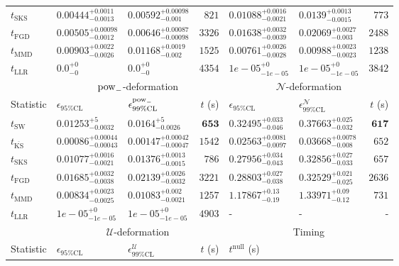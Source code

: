 \begin{tabular}{l|llr|llr}
	$t_{\mathrm{SKS}}$ & $0.00444_{-0.0013}^{+0.0011}$ & $0.00592_{-0.001}^{+0.00098}$ & $821$ & $0.01088_{-0.0021}^{+0.0016}$ & $0.0139_{-0.0015}^{+0.0013}$ & $773$ \\
	$t_{\mathrm{FGD}}$ & $0.00505_{-0.0012}^{+0.00098}$ & $0.00646_{-0.00098}^{+0.00087}$ & $3326$ & $0.01638_{-0.0039}^{+0.0032}$ & $0.02069_{-0.003}^{+0.0027}$ & $2488$ \\
	$t_{\mathrm{MMD}}$ & $0.00903_{-0.0026}^{+0.0022}$ & $0.01168_{-0.002}^{+0.0019}$ & $1525$ & $0.00761_{-0.0028}^{+0.0026}$ & $0.00988_{-0.0023}^{+0.0023}$ & $1238$ \\
	$t_{\mathrm{LLR}}$ & $0.0_{-0}^{+0}$ & $0.0_{-0}^{+0}$ & $4354$ & $1e-05_{-1e-05}^{+0}$ & $1e-05_{-1e-05}^{+0}$ & $3842$ \\
	\toprule
	\multicolumn{1}{c}{} & \multicolumn{3}{c}{$\rm{pow}_{-}$-deformation} & \multicolumn{3}{c}{$\mathcal{N}$-deformation} \\
	Statistic & $\epsilon_{95\%\mathrm{CL}}$ & $\epsilon^  {\rm{pow}_{-}}_{99\%\mathrm{CL}}$ & $t$ (s) & $\epsilon_{95\%\mathrm{CL}}$ & $\epsilon^    {\mathcal{N}}_{99\%\mathrm{CL}}$ & $t$ (s) \\
	\midrule
	$t_{\mathrm{SW}}$ & $0.01253_{-0.0032}^{+5}$ & $0.0164_{-0.0026}^{+5}$ & ${\mathbf{653}}$ & $0.32495_{-0.046}^{+0.033}$ & $0.37663_{-0.032}^{+0.025}$ & ${\mathbf{617}}$ \\
	$t_{\overline{\mathrm{KS}}}$ & ${\mathbf{0.00086_{-0.00043}^{+0.00044}}}$ & ${\mathbf{0.00147_{-0.00047}^{+0.00042}}}$ & $1542$ & ${\mathbf{0.02563_{-0.0097}^{+0.0081}}}$ & ${\mathbf{0.03668_{-0.008}^{+0.0078}}}$ & $652$ \\
	$t_{\mathrm{SKS}}$ & $0.01077_{-0.0021}^{+0.0016}$ & $0.01376_{-0.0015}^{+0.0013}$ & $786$ & $0.27956_{-0.043}^{+0.034}$ & $0.32856_{-0.033}^{+0.027}$ & $657$ \\
	$t_{\mathrm{FGD}}$ & $0.01685_{-0.0038}^{+0.0032}$ & $0.02139_{-0.0032}^{+0.0026}$ & $3221$ & $0.28803_{-0.038}^{+0.027}$ & $0.32529_{-0.025}^{+0.021}$ & $2636$ \\
	$t_{\mathrm{MMD}}$ & $0.00834_{-0.0025}^{+0.0023}$ & $0.01083_{-0.0021}^{+0.002}$ & $1257$ & $1.17867_{-0.19}^{+0.13}$ & $1.33971_{-0.12}^{+0.09}$ & $731$ \\
	$t_{\mathrm{LLR}}$ & $1e-05_{-1e-05}^{+0}$ & $1e-05_{-1e-05}^{+0}$ & $4903$ & - & - & - \\
	\toprule
	\multicolumn{1}{c}{} & \multicolumn{3}{c}{$\mathcal{U}$-deformation} & \multicolumn{3}{c}{Timing} \\
	Statistic & $\epsilon_{95\%\mathrm{CL}}$ & $\epsilon^    {\mathcal{U}}_{99\%\mathrm{CL}}$ & $t$ (s) & $t^{\mathrm{null}}$ (s) \\

\end{tabular}
